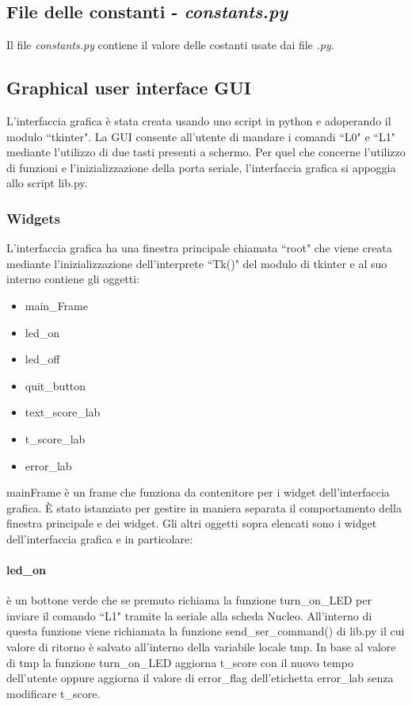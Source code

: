 \documentclass[a4paper]{article}
\begin{document}
\subsection{File delle constanti - \textit{constants.py}}
Il file \textit{constants.py} contiene il valore delle costanti usate dai file \textit{.py}.
\subsection{Graphical user interface GUI}
L'interfaccia grafica è stata creata usando uno script in python e adoperando il modulo ``tkinter". La GUI consente all'utente di mandare i comandi ``L0" e ``L1" mediante l'utilizzo di due tasti presenti a schermo. Per quel che concerne l'utilizzo di funzioni e l'inizializzazione della porta seriale, l'interfaccia grafica si appoggia allo script lib.py.
\subsubsection{Widgets}
L'interfaccia grafica ha una finestra principale chiamata ``root" che viene creata mediante l'inizializzazione dell'interprete ``Tk()" del modulo di tkinter e al suo interno contiene gli oggetti:
\begin{itemize}
	\item main\_Frame
	\item led\_on
	\item led\_off
	\item quit\_button
	\item text\_score\_lab
	\item t\_score\_lab
	\item error\_lab
\end{itemize}
mainFrame è un frame che funziona da contenitore per i widget dell'interfaccia grafica. \`E stato istanziato per gestire in maniera separata il comportamento della finestra principale e dei widget.
Gli altri oggetti sopra elencati sono i widget dell'interfaccia grafica e in particolare:
\paragraph{led\_on} è un bottone verde che se premuto richiama la funzione turn\_on\_LED per inviare il comando ``L1" tramite la seriale alla scheda Nucleo. All'interno di questa funzione viene richiamata la funzione send\_ser\_command() di lib.py il cui valore di ritorno è salvato all'interno della variabile locale tmp. In base al valore di tmp la funzione turn\_on\_LED aggiorna t\_score con il nuovo tempo dell'utente oppure aggiorna il valore di error\_flag dell'etichetta error\_lab senza modificare t\_score.
\end{document}
